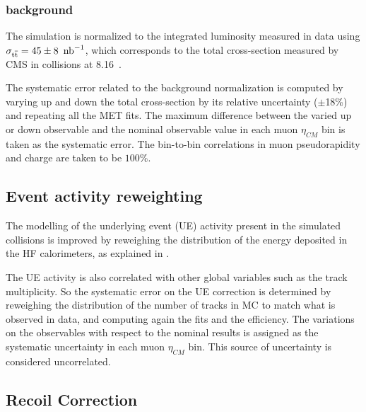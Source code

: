 \subsubsection{\texorpdfstring{\ttbar}\ background}

The \ttbar simulation is normalized to the integrated luminosity measured in data using $\sigma_{\text{t}\overline{\text{t}}} = 45 \pm 8~\mbox{\ensuremath{\,\text{nb}^\text{$-$1}}}$, which corresponds to the total \ttbar cross-section measured by CMS in \pPb collisions at 8.16~\TeV \cite{HIN-17-002}.

The systematic error related to the \ttbar background normalization is computed by varying up and down the total cross-section by its relative uncertainty ($\pm$18\%) and repeating all the MET fits. The maximum difference between the varied up or down observable and the nominal observable value in each muon $\eta_{CM}$ bin is taken as the systematic error. The bin-to-bin correlations in muon pseudorapidity and charge are taken to be $100\%$.

\subsection{Event activity reweighting}

The modelling of the underlying event (UE) activity present in the simulated \pPb collisions is improved by reweighing the distribution of the energy deposited in the HF calorimeters, as explained in .

The UE activity is also correlated with other global variables such as the track multiplicity. So the systematic error on the UE correction is determined by reweighing the distribution of the number of tracks in MC to match what is observed in data, and computing again the fits and the efficiency. The variations on the observables with respect to the nominal results is assigned as the systematic uncertainty in each muon $\eta_{CM}$ bin. This source of uncertainty is considered uncorrelated.

\subsection{Recoil Correction}


